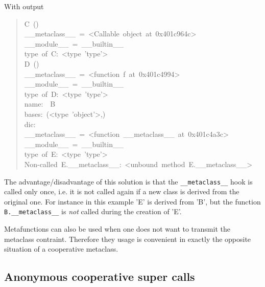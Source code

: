 \documentclass[10pt,english]{article}
\begin{document}
With output
\begin{quote}
\begin{ttfamily}\begin{flushleft}
\mbox{C~()~}\\
\mbox{{\_}{\_}metaclass{\_}{\_}~=~<Callable~object~at~0x401c964c>}\\
\mbox{{\_}{\_}module{\_}{\_}~=~{\_}{\_}builtin{\_}{\_}}\\
\mbox{type~of~C:~<type~'type'>}\\
\mbox{D~()~}\\
\mbox{{\_}{\_}metaclass{\_}{\_}~=~<function~f~at~0x401c4994>}\\
\mbox{{\_}{\_}module{\_}{\_}~=~{\_}{\_}builtin{\_}{\_}}\\
\mbox{type~of~D:~<type~'type'>}\\
\mbox{name:~~B}\\
\mbox{bases:~(<type~'object'>,)}\\
\mbox{dic:~}\\
\mbox{{\_}{\_}metaclass{\_}{\_}~=~<function~{\_}{\_}metaclass{\_}{\_}~at~0x401c4a3c>}\\
\mbox{{\_}{\_}module{\_}{\_}~=~{\_}{\_}builtin{\_}{\_}}\\
\mbox{type~of~E:~<type~'type'>}\\
\mbox{Non-called~E.{\_}{\_}metaclass{\_}{\_}:~<unbound~method~E.{\_}{\_}metaclass{\_}{\_}>}
\end{flushleft}\end{ttfamily}
\end{quote}

The advantage/disadvantage of this solution is that the \texttt{{\_}{\_}metaclass{\_}{\_}} 
hook is called only once, i.e. it is not called again if a new class
is derived from the original one. For instance in this example 'E' is
derived from 'B', but the function \texttt{B.{\_}{\_}metaclass{\_}{\_}} is \emph{not} called
during the creation of 'E'.

Metafunctions can also be used when one does not want to transmit the
metaclass contraint. Therefore they usage is convenient in exactly
the opposite situation of a cooperative metaclass.



\hypertarget{anonymous-cooperative-super-calls}{}
\subsection*{Anonymous cooperative super calls}
\end{document}
